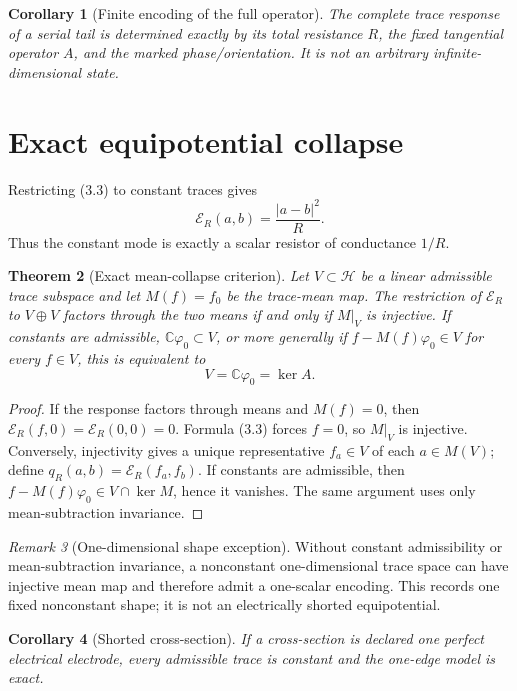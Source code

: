 \documentclass[10pt]{article}
\newtheorem{theorem}{Theorem}[section]
\newtheorem{corollary}[theorem]{Corollary}
\theoremstyle{definition}
\theoremstyle{remark}
\newtheorem{remark}[theorem]{Remark}
\begin{document}
\begin{corollary}[Finite encoding of the full operator]
The complete trace response of a serial tail is determined exactly by its total
resistance $R$, the fixed tangential operator $A$, and the marked
phase/orientation. It is not an arbitrary infinite-dimensional state.
\end{corollary}

\section{Exact equipotential collapse}

Restricting (3.3) to constant traces gives
\[
 \mathcal E_R(a,b)=\frac{|a-b|^2}{R}.
\tag{4.1}
\]
Thus the constant mode is exactly a scalar resistor of conductance $1/R$.

\begin{theorem}[Exact mean-collapse criterion]
Let $V\subset\mathcal H$ be a linear admissible trace subspace and let
$M(f)=f_0$ be the trace-mean map. The restriction of $\mathcal E_R$ to
$V\oplus V$ factors through the two means if and only if $M|_V$ is injective.
If constants are admissible, $\mathbb C\varphi_0\subset V$, or more generally
if $f-M(f)\varphi_0\in V$ for every $f\in V$, this is equivalent to
\[
 V=\mathbb C\varphi_0=\ker A.
\tag{4.2}
\]
\end{theorem}

\begin{proof}
If the response factors through means and $M(f)=0$, then
$\mathcal E_R(f,0)=\mathcal E_R(0,0)=0$. Formula (3.3) forces $f=0$, so
$M|_V$ is injective. Conversely, injectivity gives a unique representative
$f_a\in V$ of each $a\in M(V)$; define
$q_R(a,b)=\mathcal E_R(f_a,f_b)$. If constants are admissible, then
$f-M(f)\varphi_0\in V\cap\ker M$, hence it vanishes. The same argument uses
only mean-subtraction invariance.
\end{proof}

\begin{remark}[One-dimensional shape exception]
Without constant admissibility or mean-subtraction invariance, a nonconstant
one-dimensional trace space can have injective mean map and therefore admit a
one-scalar encoding. This records one fixed nonconstant shape; it is not an
electrically shorted equipotential.
\end{remark}

\begin{corollary}[Shorted cross-section]
If a cross-section is declared one perfect electrical electrode, every
admissible trace is constant and the one-edge model is exact.
\end{corollary}
\end{document}
